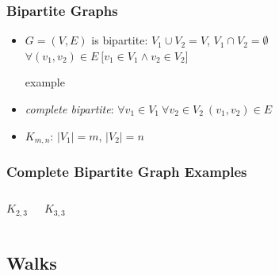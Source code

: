 \documentclass[dvipsnames]{beamer}
\begin{document}
\begin{frame}
  \frametitle{Bipartite Graphs}

  \begin{itemize}
    \item $G=(V,E)$ is \alert{bipartite}:
      $V_1 \cup V_2 = V$, $V_1 \cap V_2 = \emptyset$\\
      $\forall (v_1,v_2) \in E~[v_1 \in V_1 \wedge v_2 \in V_2$]

  \begin{exampleblock}{example}
    \begin{center}
    \end{center}
  \end{exampleblock}

    \medskip
    \item \emph{complete bipartite}:
      $\forall v_1 \in V_1~\forall v_2 \in V_2~(v_1,v_2) \in E$
    \item $K_{m,n}$: $|V_1|=m$, $|V_2|=n$
  \end{itemize}
\end{frame}

\begin{frame}
  \frametitle{Complete Bipartite Graph Examples}

  \begin{columns}[t]
    \begin{center}
      $K_{2,3}$

      \bigskip
    \end{center}

    \begin{center}
      $K_{3,3}$

      \bigskip
    \end{center}
  \end{columns}
\end{frame}

\subsection{Walks}
\end{document}
